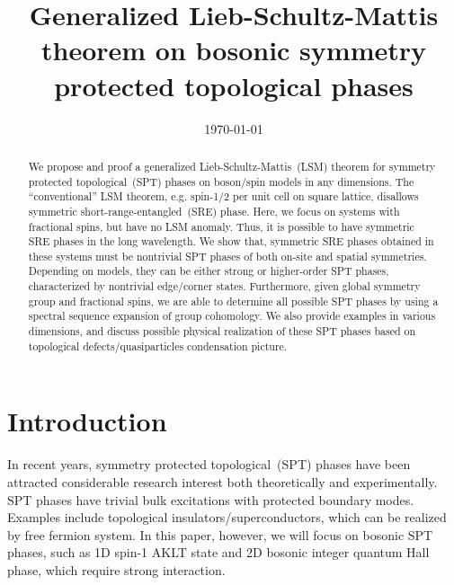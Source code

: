 \documentclass[%
 reprint,
 amsmath,amssymb,
 aps,pra,
]{revtex4-1}
\begin{document}
\title{Generalized Lieb-Schultz-Mattis theorem on bosonic symmetry protected topological phases}%

\date{\today}

\begin{abstract}
We propose and proof a generalized Lieb-Schultz-Mattis~(LSM) theorem for symmetry protected topological~(SPT) phases on boson/spin models in any dimensions.
The ``conventional'' LSM theorem, e.g. spin-1/2 per unit cell on square lattice, disallows symmetric short-range-entangled~(SRE) phase. 
Here, we focus on systems with fractional spins, but have no LSM anomaly. 
Thus, it is possible to have symmetric SRE phases in the long wavelength.
We show that, symmetric SRE phases obtained in these systems must be nontrivial SPT phases of both on-site and spatial symmetries.
Depending on models, they can be either strong or higher-order SPT phases, characterized by nontrivial edge/corner states.
Furthermore, given global symmetry group and fractional spins, we are able to determine all possible SPT phases by using a spectral sequence expansion of group cohomology.
We also provide examples in various dimensions, and discuss possible physical realization of these SPT phases based on topological defects/quasiparticles condensation picture.
\end{abstract}

\maketitle

\tableofcontents


\section{Introduction}\label{sec:intro}
In recent years, symmetry protected topological~(SPT) phases have been attracted considerable research interest both theoretically and experimentally.
SPT phases have trivial bulk excitations with protected boundary modes.
Examples include topological insulators/superconductors, which can be realized by free fermion system. 
In this paper, however, we will focus on bosonic SPT phases, such as 1D spin-1 AKLT state and 2D bosonic integer quantum Hall phase, which require strong interaction.
\end{document}
